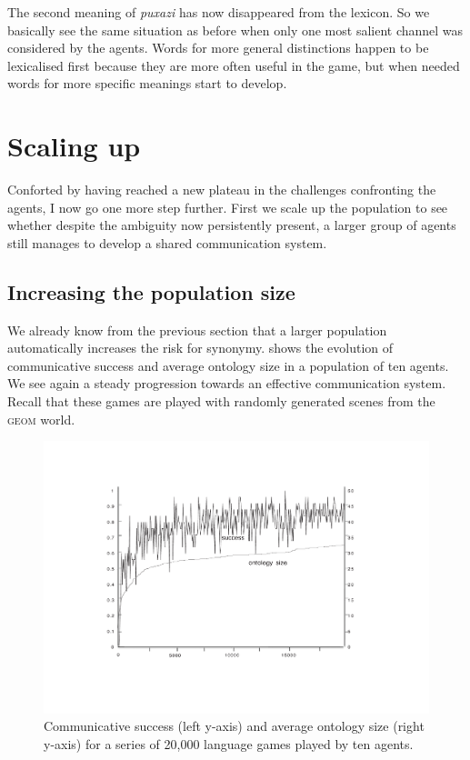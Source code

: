 The second meaning of \textit{puxazi} has now disappeared
from the lexicon. So we basically see the same situation 
as before when only one most salient channel was
considered by the agents. Words for more general distinctions
happen to be lexicalised first because they are more 
often useful in the game, but when needed words for more specific
meanings start to develop. 

\section{Scaling up}

Conforted by having reached a new plateau in 
the challenges confronting the agents, I now go 
one more step further. First we scale up the 
population to see whether despite the ambiguity
now persistently present, a larger group of 
agents still manages to develop a shared
communication system. 

\subsection{Increasing the population size}

We already know from the previous section that 
a larger population automatically increases
the risk for synonymy.  shows the 
evolution of communicative success and average
ontology size in a population
of ten agents. We see again a steady progression
towards an effective communication system. Recall that 
these games are played with randomly generated scenes
from the \textsc{geom} world. 


\begin{figure}[htbp]
  \centerline{\includegraphics[width=\textwidth]{chap6/figs/agnt10.pdf}}
\caption{\label{agnt10}Communicative 
success (left y-axis) and average ontology size 
(right y-axis) for a series of 20,000 
language games played by ten agents.} 
\end{figure}

